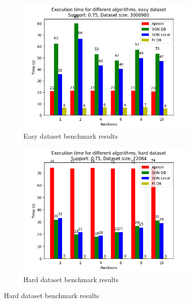 \documentclass[a4paper]{article}
\begin{document}
	
	
	
	\begin{figure}[h]
		\centering
		\begin{subfigure}[b]{\textwidth}
			\centering
			\includegraphics[width=\textwidth]{1_easy_0,75_1_partitions.png}
         	\caption{Easy dataset benchmark results}
         	\label{fig:1-075sup-1ds-par-e}
		\end{subfigure}
		\hfill		
		\begin{subfigure}[b]{\textwidth}
			\centering
			\includegraphics[width=\textwidth]{1_hard_0,75_1_partitions.png}
         	\caption{Hard dataset benchmark results}
         	\label{fig:1-075sup-1ds-par-h}
		\end{subfigure}
		\hfill
		
	\end{figure}
	
\end{document}
